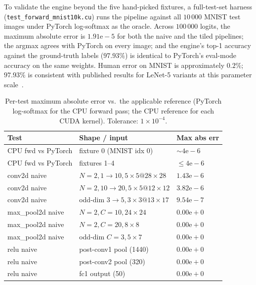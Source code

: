 \documentclass[conference]{IEEEtran}
\begin{document}
To validate the engine beyond the five hand-picked fixtures, a
full-test-set harness (\texttt{test\_forward\_mnist10k.cu}) runs the
pipeline against all $10\,000$ MNIST test images under PyTorch
log-softmax as the oracle. Across $100\,000$ logits, the maximum
absolute error is $1.91\mathrm{e}{-}5$ for both the naive and the tiled
pipelines; the argmax agrees with PyTorch on every image; and the
engine's top-1 accuracy against the ground-truth labels ($97.93\%$) is
identical to PyTorch's eval-mode accuracy on the same weights.
Human error on MNIST is approximately $0.2\%$; $97.93\%$ is
consistent with published results for LeNet-5 variants at this
parameter scale~\cite{lecun1998}.

\begin{table}[htbp]
\caption{Per-test maximum absolute error vs.\ the applicable reference
(PyTorch log-softmax for the CPU forward pass; the CPU reference for
each CUDA kernel). Tolerance: $1\times10^{-4}$.}
\label{tab:parity}
\begin{center}
\scriptsize
\begin{tabular}{@{}lll@{}}
\toprule
\textbf{Test} & \textbf{Shape / input} & \textbf{Max abs err} \\
\midrule
CPU fwd vs PyTorch & fixture 0 (MNIST idx 0) & $\sim 4\mathrm{e}{-}6$ \\
CPU fwd vs PyTorch & fixtures 1--4          & $\le 4\mathrm{e}{-}6$ \\
\addlinespace
conv2d naive     & $N{=}2, 1{\to}10, 5{\times}5 @ 28{\times}28$ & $1.43\mathrm{e}{-}6$ \\
conv2d naive     & $N{=}2, 10{\to}20, 5{\times}5 @ 12{\times}12$ & $3.82\mathrm{e}{-}6$ \\
conv2d naive     & odd-dim $3{\to}5, 3{\times}3 @ 13{\times}17$  & $9.54\mathrm{e}{-}7$ \\
\addlinespace
max\_pool2d naive & $N{=}2, C{=}10, 24{\times}24$ & $0.00\mathrm{e}{+}0$ \\
max\_pool2d naive & $N{=}2, C{=}20,  8{\times}8$  & $0.00\mathrm{e}{+}0$ \\
max\_pool2d naive & odd-dim $C{=}3,  5{\times}7$  & $0.00\mathrm{e}{+}0$ \\
\addlinespace
relu naive       & post-conv1 pool (1440)                      & $0.00\mathrm{e}{+}0$ \\
relu naive       & post-conv2 pool (320)                       & $0.00\mathrm{e}{+}0$ \\
relu naive       & fc1 output (50)                             & $0.00\mathrm{e}{+}0$ \\

\end{tabular}
\end{center}
\end{table}
\end{document}
